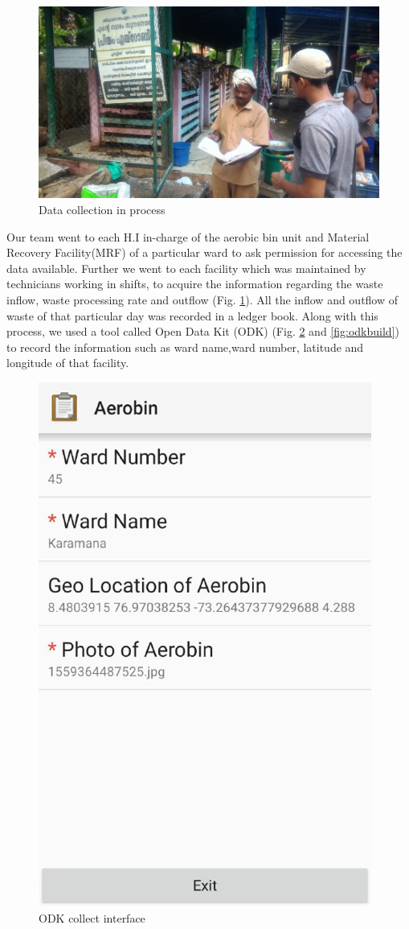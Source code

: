 \documentclass[12pt,a4paper]{report}
\begin{document}
\begin{figure}[H]
	\centering
	\includegraphics[width=0.7\linewidth]{data_collect}
	\caption{Data collection in process}
	\label{fig:datacollect}
\end{figure}

Our team went to each H.I in-charge of the aerobic bin unit and Material Recovery Facility(MRF) of a particular ward to ask permission for accessing the data available. Further we went to each facility which was maintained by technicians working in shifts, to acquire the information regarding the waste inflow, waste processing rate and outflow (Fig. \ref{fig:datacollect}). All the inflow and outflow of waste of that particular day was recorded in a ledger book. Along with this process, we used a tool called Open Data Kit (ODK) (Fig. \ref{fig:odk} and \ref{fig:odkbuild}) to record the information such as ward name,ward number, latitude and longitude of that facility.

\begin{figure}[H]
	\centering
	\includegraphics[width=0.5\linewidth]{odk}
	\caption{ODK collect interface}
	\label{fig:odk}
\end{figure}	
\end{document}
